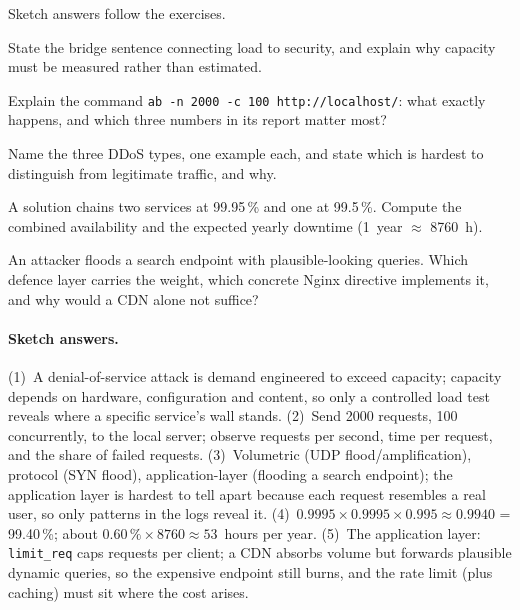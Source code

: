 Sketch answers follow the exercises.

\begin{exercise}
State the bridge sentence connecting load to security, and explain why
capacity must be measured rather than estimated.
\end{exercise}

\begin{exercise}
Explain the command \texttt{ab -n 2000 -c 100 http://localhost/}: what
exactly happens, and which three numbers in its report matter most?
\end{exercise}

\begin{exercise}
Name the three DDoS types, one example each, and state which is hardest to
distinguish from legitimate traffic, and why.
\end{exercise}

\begin{exercise}
A solution chains two services at 99.95\,\% and one at 99.5\,\%. Compute the
combined availability and the expected yearly downtime (1~year
$\approx$ 8760~h).
\end{exercise}

\begin{exercise}
An attacker floods a search endpoint with plausible-looking queries. Which
defence layer carries the weight, which concrete Nginx directive implements
it, and why would a CDN alone not suffice?
\end{exercise}

\paragraph{Sketch answers.}
{\small
(1)~A denial-of-service attack is demand engineered to exceed capacity;
capacity depends on hardware, configuration and content, so only a controlled
load test reveals where a specific service's wall stands. (2)~Send 2000
requests, 100 concurrently, to the local server; observe requests per second,
time per request, and the share of failed requests. (3)~Volumetric (UDP
flood/amplification), protocol (SYN flood), application-layer (flooding a
search endpoint); the application layer is hardest to tell apart because each
request resembles a real user, so only patterns in the logs reveal it.
(4)~$0.9995 \times 0.9995 \times 0.995 \approx 0.9940$ = 99.40\,\%; about
$0.60\,\% \times 8760 \approx 53$~hours per year. (5)~The application layer:
\texttt{limit\_req} caps requests per client; a CDN absorbs volume but forwards
plausible dynamic queries, so the expensive endpoint still burns, and the rate
limit (plus caching) must sit where the cost arises.}


